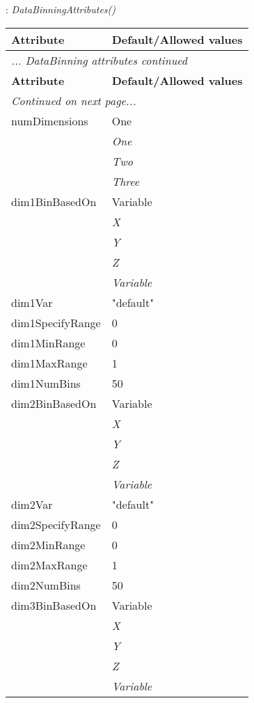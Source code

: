 \documentclass[10pt,a4paper]{report}
\begin{document}
\newpage

{}
: {\it DataBinningAttributes() }\\[-3mm]

\begin{longtable}{ll}
{\bf Attribute} & {\bf Default/Allowed values} \\
\hline \hline
\endfirsthead
\multicolumn{2}{l}{{\it ... DataBinning attributes continued}} \\
{\bf Attribute} & {\bf Default/Allowed values} \\
\hline \hline
\endhead
\hline
\multicolumn{2}{l}{{\it Continued on next page...}} \\
\endfoot
\hline
\endlastfoot

numDimensions  &  One   \\
 & {\it  One} \\
 & {\it  Two} \\
 & {\it  Three} \\
dim1BinBasedOn  &  Variable   \\
 & {\it  X} \\
 & {\it  Y} \\
 & {\it  Z} \\
 & {\it  Variable} \\
dim1Var  &  "default" \\
dim1SpecifyRange  &  0 \\
dim1MinRange  &  0 \\
dim1MaxRange  &  1 \\
dim1NumBins  &  50 \\
dim2BinBasedOn  &  Variable   \\
 & {\it  X} \\
 & {\it  Y} \\
 & {\it  Z} \\
 & {\it  Variable} \\
dim2Var  &  "default" \\
dim2SpecifyRange  &  0 \\
dim2MinRange  &  0 \\
dim2MaxRange  &  1 \\
dim2NumBins  &  50 \\
dim3BinBasedOn  &  Variable   \\
 & {\it  X} \\
 & {\it  Y} \\
 & {\it  Z} \\
 & {\it  Variable} \\

\end{longtable}
\end{document}
